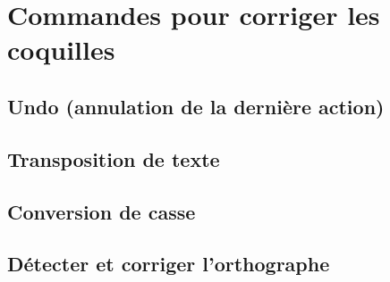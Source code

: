 \chapter{Commandes pour corriger les coquilles}\label{chap13}
\section{Undo (annulation de la dernière action)}\label{chap13sec1}
\section{Transposition de texte}\label{chap13sec2}
\section{Conversion de casse}\label{chap13sec3}
\section{Détecter et corriger l'orthographe}\label{chap13sec4}
